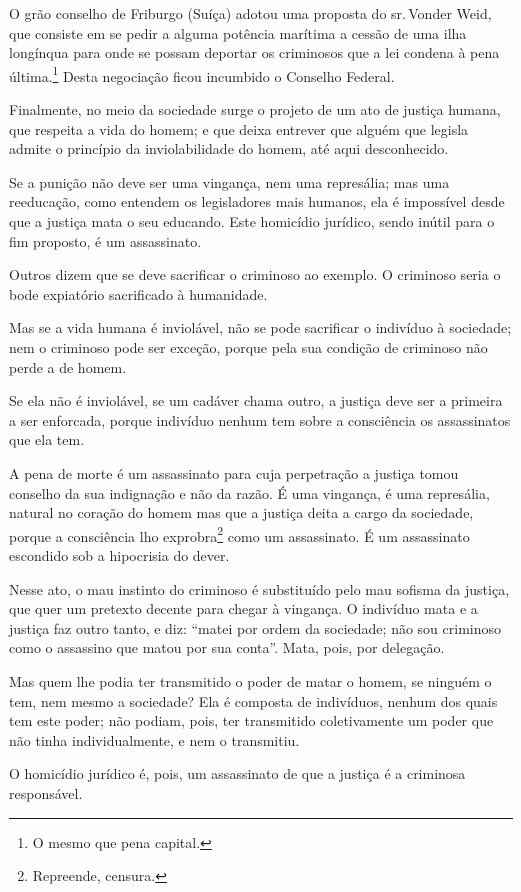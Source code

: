 O grão conselho de Friburgo (Suíça) adotou uma proposta do sr.\,Vonder
Weid, que consiste em se pedir a alguma potência marítima a cessão de
uma ilha longínqua para onde se possam deportar os criminosos que a lei
condena à pena última.\footnote{O mesmo que pena capital.} Desta
negociação ficou incumbido o Conselho Federal.

Finalmente, no meio da sociedade surge o projeto de um ato de justiça
humana, que respeita a vida do homem; e que deixa entrever que alguém
que legisla admite o princípio da inviolabilidade do homem, até aqui
desconhecido.

Se a punição não deve ser uma vingança, nem uma represália; mas uma
reeducação, como entendem os legisladores mais humanos, ela é impossível
desde que a justiça mata o seu educando. Este homicídio jurídico, sendo
inútil para o fim proposto, é um assassinato.

Outros dizem que se deve sacrificar o criminoso ao exemplo. O criminoso
seria o bode expiatório sacrificado à humanidade.

Mas se a vida humana é inviolável, não se pode sacrificar o indivíduo à
sociedade; nem o criminoso pode ser exceção, porque pela sua condição de
criminoso não perde a de homem.

Se ela não é inviolável, se um cadáver chama outro, a justiça deve ser a
primeira a ser enforcada, porque indivíduo nenhum tem sobre a
consciência os assassinatos que ela tem.

A pena de morte é um assassinato para cuja perpetração a justiça tomou
conselho da sua indignação e não da razão. É uma vingança, é uma
represália, natural no coração do homem mas que a justiça deita a cargo
da sociedade, porque a consciência lho exprobra\footnote{Repreende,
  censura.} como um assassinato. É um assassinato escondido sob a
hipocrisia do dever.

Nesse ato, o mau instinto do criminoso é substituído pelo mau sofisma da
justiça, que quer um pretexto decente para chegar à vingança. O
indivíduo mata e a justiça faz outro tanto, e diz: ``matei por ordem da
sociedade; não sou criminoso como o assassino que matou por sua conta''.
Mata, pois, por delegação.

Mas quem lhe podia ter transmitido o poder de matar o homem, se ninguém
o tem, nem mesmo a sociedade? Ela é composta de indivíduos, nenhum dos
quais tem este poder; não podiam, pois, ter transmitido coletivamente um
poder que não tinha individualmente, e nem o transmitiu.

O homicídio jurídico é, pois, um assassinato de que a justiça é a
criminosa responsável.

